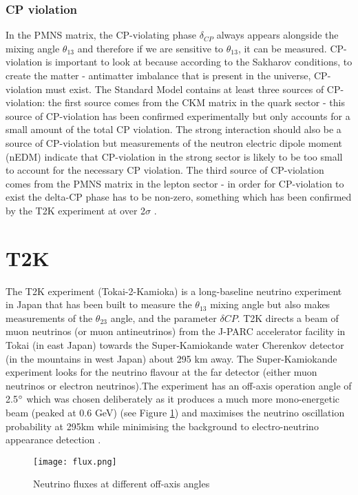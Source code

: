 \documentclass[11pt,oneside,a4paper]{article}
\begin{document}
\subsubsection{CP violation}

In the PMNS matrix, the CP-violating phase $\delta_{CP}$ always appears alongside the mixing angle $\theta_{13}$ and therefore if we are sensitive to $\theta_{13}$, it can be measured. CP-violation is important to look at because according to the Sakharov conditions, to create the matter - antimatter imbalance that is present in the universe, CP-violation must exist. The Standard Model contains at least three sources of CP-violation: the first source comes from the CKM matrix in the quark sector - this source of CP-violation has been confirmed experimentally but only accounts for a small amount of the total CP violation. The strong interaction should also be a source of CP-violation but measurements of the neutron electric dipole moment (nEDM) indicate that CP-violation in the strong sector is likely to be too small to account for the necessary CP violation. The third source of CP-violation comes from the PMNS matrix in the lepton sector - in order for CP-violation to exist the delta-CP phase has to be non-zero, something which has been confirmed by the T2K experiment at over 2$\sigma$ \cite{t2k2sigma}. 


\section{T2K}

The T2K experiment (Tokai-2-Kamioka) is a long-baseline neutrino experiment in Japan that has been built to measure the $\theta_{13}$ mixing angle but also makes measurements of the $\theta_{23}$ angle, and the parameter $\delta CP$. T2K directs a beam of muon neutrinos (or muon antineutrinos) from the J-PARC accelerator facility in Tokai (in east Japan) towards the Super-Kamiokande water Cherenkov detector (in the mountains in west Japan) about 295 km away. The Super-Kamiokande experiment looks for the neutrino flavour at the far detector (either muon neutrinos or electron neutrinos).\cite{t2kexperiment}The experiment has an off-axis operation angle of 2.5$\degree$ which was chosen deliberately as it produces a much more mono-energetic beam (peaked at 0.6 GeV) (see Figure \ref{fig:flux}) and maximises the neutrino oscillation probability at 295km while minimising the background to electro-neutrino appearance detection \cite{t2kflux}.

\begin{figure}[htbp]
	\centering
	\texttt{[image: flux.png]}
	\caption{Neutrino fluxes at different off-axis angles}
	\label{fig:flux}
\end{figure}
\end{document}
